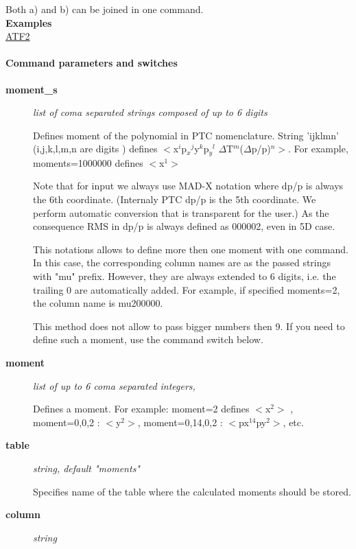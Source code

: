  Both a) and b) can be joined in one command.    \\

\textbf{ Examples}\\

\href{http://cern.ch/frs/mad-X_examples/ptc_madx_interface/moments/moments.madx}{ ATF2 }


\paragraph{ Command parameters and switches }
\begin{description}
	\item[\textbf{ moment\_s }] \textit{ list of coma separated strings composed of up to 6 digits }

 Defines moment of the polynomial in PTC nomenclature.        String 'ijklmn' (i,j,k,l,m,n are digits ) defines        $<$x$^i$p$_x$$^j$y$^k$p$_y$$^l$       $\Delta$T$^m$($\Delta$p/p)$^n$$>$.       For example, moments=1000000 defines $<$x$^1$$>$   

       Note that for input we always use MAD-X notation where dp/p is always the 6th coordinate.       (Internaly PTC dp/p is the 5th coordinate. We perform automatic conversion that is transparent for the user.)       As the consequence RMS in dp/p is always defined as 000002, even in 5D case.   

          This notations allows to define more then one moment with one command. In this case,       the corresponding column names are as the passed strings with "mu" prefix.       However, they are always extended to 6 digits, i.e. the trailing 0 are automatically added.       For example, if specified moments=2, the column name is mu200000.    

           This method does not allow to pass bigger numbers then 9. If you need to define       such a moment, use the command switch below.   
	\item[\textbf{ moment }] \textit{ list of up to 6 coma separated integers, }

 Defines a moment. For example: moment=2 defines $<$x$^2$$>$ ,        moment=0,0,2 : $<$y$^2$$>$,        moment=0,14,0,2 : $<$px$^{14}$py$^2$$>$, etc.   
	\item[\textbf{ table }] \textit{ string, default "moments" }

 Specifies name of the table where the calculated moments should be stored.   
	\item[\textbf{ column }] \textit{ string }


\end{description}
